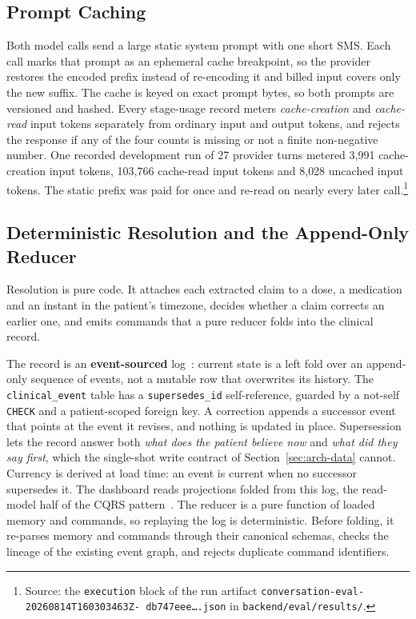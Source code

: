 \subsection{Prompt Caching}
\label{sec:conv-caching}

Both model calls send a large static system prompt with one short SMS. Each call
marks that prompt as an ephemeral cache breakpoint, so the provider restores the
encoded prefix instead of re-encoding it and billed input covers only the new
suffix. The cache is keyed on exact prompt bytes, so both prompts are versioned
and hashed. Every stage-usage record meters \emph{cache-creation} and
\emph{cache-read} input tokens separately from ordinary input and output tokens,
and rejects the response if any of the four counts is missing or not a finite
non-negative number. One recorded development run of 27 provider turns metered
3{,}991 cache-creation input tokens, 103{,}766 cache-read input tokens and
8{,}028 uncached input tokens. The static prefix was paid for once and re-read on
nearly every later call.\footnote{Source: the \texttt{execution} block of the run
artifact \texttt{conversation-eval-\allowbreak 20260814T160303463Z-\allowbreak
db747eee\dots.json} in \texttt{backend/eval/results/}.}

\subsection{Deterministic Resolution and the Append-Only Reducer}
\label{sec:conv-record}

Resolution is pure code. It attaches each extracted claim to a dose, a
medication and an instant in the patient's timezone, decides whether a claim
corrects an earlier one, and emits commands that a pure reducer folds into the
clinical record.

The record is an \textbf{event-sourced} log~\cite{fowler2005eventsourcing}:
current state is a left fold over an append-only sequence of events, not a
mutable row that overwrites its history. The \texttt{clinical\_event} table has a
\texttt{supersedes\_id} self-reference, guarded by a not-self \texttt{CHECK} and
a patient-scoped foreign key. A correction appends a successor event that points
at the event it revises, and nothing is updated in place. Supersession lets the
record answer both \emph{what does the patient believe now} and \emph{what did
they say first}, which the single-shot write contract of
Section~\ref{sec:arch-data} cannot. Currency is derived at load time: an event is
current when no successor supersedes it. The dashboard reads projections folded
from this log, the read-model half of the CQRS pattern~\cite{fowler2011cqrs}. The
reducer is a pure function of loaded memory and commands, so replaying the log is
deterministic. Before folding, it re-parses memory and commands through their
canonical schemas, checks the lineage of the existing event graph, and rejects
duplicate command identifiers.

